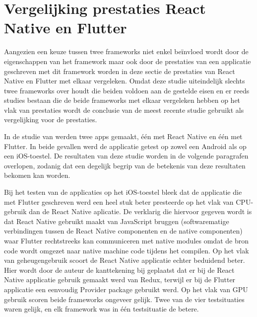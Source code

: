 \section{Vergelijking prestaties React Native en Flutter}
\label{sec:vglPrestaties}

Aangezien een keuze tussen twee frameworks niet enkel beïnvloed wordt door de eigenschappen van het framework maar ook door de prestaties van een applicatie geschreven met dit framework worden in deze sectie de prestaties van React Native en Flutter met elkaar vergeleken. Omdat deze studie uiteindelijk slechts twee frameworks over houdt die beiden voldoen aan de gestelde eisen en er reeds studies bestaan die de beide frameworks met elkaar vergeleken hebben op het vlak van prestaties wordt de conclusie van de meest recente studie gebruikt als vergelijking voor de prestaties. 

In de studie van \textcite{Fentaw2020} werden twee apps gemaakt, één met React Native en één met Flutter. In beide gevallen werd de applicatie getest op zowel een Android als op een iOS-toestel. De resultaten van deze studie worden in de volgende paragrafen overlopen, zodanig dat een degelijk begrip van de betekenis van deze resultaten bekomen kan worden.

Bij het testen van de applicaties op het iOS-toestel bleek dat de applicatie die met Flutter geschreven werd een heel stuk beter presteerde op het vlak van CPU-gebruik dan de React Native aplicatie. De verklarig die hiervoor gegeven wordt is dat React Native gebruikt maakt van JavaScript bruggen (softwarematige verbindingen tussen de React Native componenten en de native componenten) waar Flutter rechtstreeks kan communiceren met native modules omdat de bron code wordt omgezet naar native machine code tijdens het compilen. Op het vlak van geheugengebruik scoort de React Native applicatie echter beduidend beter. Hier wordt door de auteur de kanttekening bij geplaatst dat er bij de React Native applicatie gebruik gemaakt werd van Redux, terwijl er bij de Flutter applicatie een eenvoudig Provider package gebruikt werd. Op het vlak van GPU gebruik scoren beide frameworks ongeveer gelijk. Twee van de vier testsituaties waren gelijk, en elk framework was in één testsituatie de betere. 


